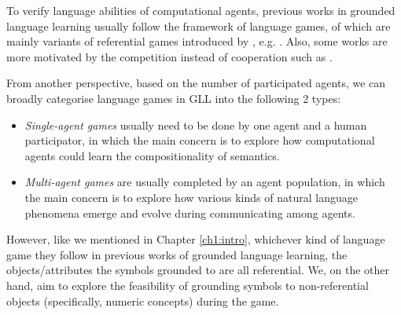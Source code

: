 To verify language abilities of computational agents, previous works in grounded language learning usually follow the framework of language games, of which are mainly variants of referential games introduced by \cite{lewis2008convention}, e.g. \cite{hermann2017grounded, havrylov2017emergence}. Also, some works are more motivated by the competition instead of cooperation such as \cite{cao2018emergent}.

From another perspective, based on the number of participated agents, we can broadly categorise language games in GLL into the following 2 types:

\begin{itemize}
  \item \textit{Single-agent games} usually need to be done by one agent and a human participator, in which the main concern is to explore how computational agents could learn the compositionality of semantics.
  \item \textit{Multi-agent games} are usually completed by an agent population, in which the main concern is to explore how various kinds of natural language phenomena emerge and evolve during communicating among agents.
\end{itemize}

However, like we mentioned in Chapter \ref{ch1:intro}, whichever kind of language game they follow in previous works of grounded language learning, the objects/attributes the symbols grounded to are all referential. We, on the other hand, aim to explore the feasibility of grounding symbols to non-referential objects (specifically, numeric concepts) during the game.